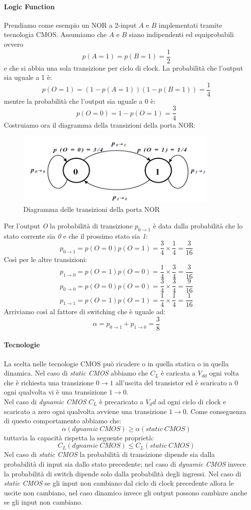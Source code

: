 \paragraph{Logic Function} Prendiamo come esempio un NOR a 2-input $A$ e $B$ implementati tramite tecnologia CMOS.
Assumiamo che $A$ e $B$ siano indipendenti ed equiprobabili ovvero 
$$p(A = 1) = p(B = 1) = \frac{1}{2}$$
e che si abbia una sola transizione per ciclo di clock.
La probabilità che l'output sia uguale a 1 è:
$$p(O = 1)= (1-p(A = 1))(1-p(B = 1)) = \frac{1}{4}$$
mentre la probabilità che l'output sia uguale a 0 è:
$$p(O = 0) = 1- p(O = 1) = \frac{3}{4}$$
Costruiamo ora il diagramma della transizioni della porta NOR:
\begin{figure}
\centering
\includegraphics[width=10cm]{img/logicFSM.png}
\caption{Diagramma delle transizioni della porta NOR}\label{fig:logicFSM}
\end{figure}
Per l'output \emph{O} la probabilità di transizione $p_{0\rightarrow1}$ è data dalla probabilità che lo stato corrente sia \emph{0} e che il prossimo stato sia \emph{1}:
$$p_{0\rightarrow 1}= p(O = 0)p(O = 1)= \frac{3}{4}\times\frac{1}{4} = \frac{3}{16}$$
Così per le altre transizioni:
$$p_{1\rightarrow 0}= p(O = 1)p(O = 0)= \frac{1}{4}\times\frac{3}{4} = \frac{3}{16}$$
$$p_{0\rightarrow 0}= p(O = 0)p(O = 0)= \frac{3}{4}\times\frac{3}{4} = \frac{9}{16}$$
$$p_{1\rightarrow 1}= p(O = 1)p(O = 1)= \frac{1}{4}\times\frac{1}{4} = \frac{1}{16}$$
Arriviamo così al fattore di switching che è uguale ad:
$$\alpha = p_{0\rightarrow 1} + p_{1\rightarrow 0} = \frac{3}{8}$$
\paragraph{Tecnologie}
La scelta nelle tecnologie CMOS può ricadere o in quella statica o in quella dinamica.
Nel caso di \emph{static CMOS} abbiamo che $C_L$ è caricata a $V_{dd}$ ogni volta che è richiesta una transizione $0 \rightarrow 1$ all'uscita del transistor ed è scaricato a 0 ogni qualvolta vi è una transizione $1 \rightarrow 0$.\\
Nel caso di \emph{dynamic CMOS} $C_L$ è precaricato a $V_dd$ ad ogni ciclo di clock e scaricato a zero ogni qualvolta avviene una transizione $1 \rightarrow 0$. Come conseguenza di questo comportamento abbiamo che:
$$\alpha(dynamic \ CMOS) \geq \alpha(static \ CMOS)$$
tuttavia la capacità rispetta la seguente proprietà:
$$C_L(dynamic \ CMOS) \leq C_L(static \ CMOS)$$
Nel caso di \emph{static CMOS} la probabilità di transizione dipende sia dalla probabilità di input sia dallo stato precedente; nel caso di \emph{dynamic CMOS} invece la probabilità di switch dipende solo dalla probabilità degli ingressi.
Nel caso di \emph{static CMOS} se gli input non cambiano dal ciclo di clock precedente allora le uscite non cambiano, nel caso dinamico invece gli output possono cambiare anche se gli input non cambiano.
